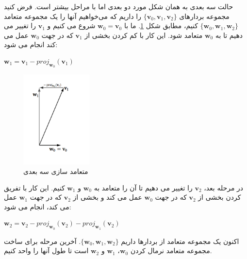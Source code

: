 {\begin{spacing}{1.5}
        حالت سه بعدی به همان شکل مورد دو بعدی اما با مراحل بیشتر است.
        فرض کنید مجموعه بردارهای $\{\textbf{v}_{0},\textbf{v}_{1},\textbf{v}_{2}\}$ را داریم که می‌خواهیم آنها را یک مجموعه متعامد $\{\textbf{w}_{0},\textbf{w}_{1},\textbf{w}_{2}\}$ کنیم، مطابق شکل \ref{fig:4.Session.1.1.12}.
        ما با $\textbf{w}_{0}=\textbf{v}_{0}$ شروع می کنیم و $\textbf{v}_{1}$ را تغییر می دهیم تا به $\textbf{w}_{0}$ متعامد شود.
        این کار با کم کردن بخشی از $\textbf{v}_{1}$ که در جهت $\textbf{w}_{0}$ عمل می کند انجام می شود:

        \begin{center}
            $\textbf{w}_{1}=\textbf{v}_{1}-proj_{\textbf{w}_{0}}(\textbf{v}_{1})$
        \end{center}

        \begin{figure}[H]
            \centering
            \setlength{\belowcaptionskip}{-10pt}
            \includegraphics[width=0.32\textwidth]{Images/4/4.Session.1.1.12}
            \caption{متعامد سازی سه بعدی}
            \label{fig:4.Session.1.1.12}
        \end{figure}

        در مرحله بعد، $\textbf{v}_{2}$ را تغییر می دهیم تا آن را متعامد به $\textbf{w}_{0}$ و $\textbf{w}_{1}$ کنیم.
        این کار با تفریق کردن بخشی از $\textbf{v}_{2}$ که در جهت $\textbf{w}_{0}$ عمل می کند و بخشی از $\textbf{v}_{2}$ که در جهت $\textbf{w}_{1}$ عمل می کند، انجام می شود:

        \begin{center}
            $\textbf{w}_{2}=\textbf{v}_{2}-proj_{\textbf{w}_{0}}(\textbf{v}_{2})-proj_{\textbf{w}_{1}}(\textbf{v}_{2})$
        \end{center}

        اکنون یک مجموعه متعامد از بردارها داریم $\{\textbf{w}_{0},\textbf{w}_{1},\textbf{w}_{2}\}$.
        آخرین مرحله برای ساخت مجموعه متعامد نرمال کردن $\textbf{w}_{0}$، $\textbf{w}_{1}$ و $\textbf{w}_{2}$ است تا طول آنها را واحد کنیم.


\end{spacing}}
